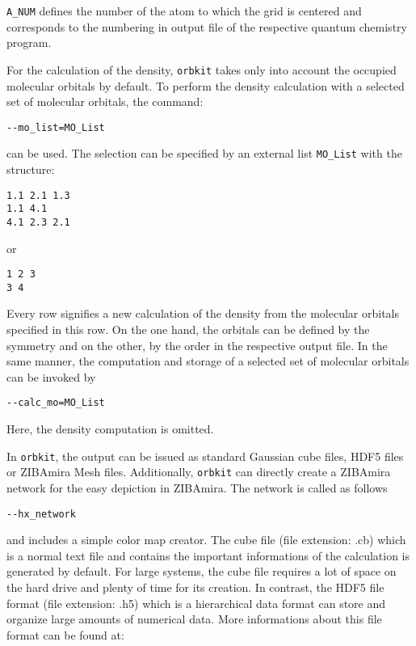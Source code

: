 \documentclass[a4paper,10pt]{scrartcl}
\begin{document}
\verb!A_NUM! defines the number of the atom to which the grid is centered
and corresponds to the numbering in output file of the respective
quantum chemistry program. 

For the calculation of the density, \texttt{orbkit} takes only into account
the occupied molecular orbitals by default. To perform the density
calculation with a selected set of molecular orbitals, the command: 

\begin{verbatim}
--mo_list=MO_List
\end{verbatim}


can be used. The selection can be specified by an external list \verb!MO_List!
with the structure: 
\begin{verbatim}
1.1 2.1 1.3
1.1 4.1
4.1 2.3 2.1
\end{verbatim}

or 

\begin{verbatim}
1 2 3
3 4
\end{verbatim}

Every row signifies a new calculation of the density from the molecular
orbitals specified in this row. On the one hand, the orbitals can
be defined by the symmetry and on the other, by the order in the respective
output file. In the same manner, the computation and storage of a
selected set of molecular orbitals can be invoked by

\begin{verbatim}
--calc_mo=MO_List
\end{verbatim}


Here, the density computation is omitted.

In \texttt{orbkit}, the output can be issued as standard Gaussian cube files,
HDF5 files or ZIBAmira Mesh files. Additionally, \texttt{orbkit} can directly
create a ZIBAmira network for the easy depiction in ZIBAmira. The
network is called as follows 

\begin{verbatim}
--hx_network
\end{verbatim}


and includes a simple color map creator. The cube file (file extension:
.cb) which is a normal text file and contains the important informations
of the calculation is generated by default. For large systems, the
cube file requires a lot of space on the hard drive and plenty of
time for its creation. In contrast, the HDF5 file format (file extension:
.h5) which is a hierarchical data format can store and organize large
amounts of numerical data. More informations about this file format
can be found at:
\end{document}
